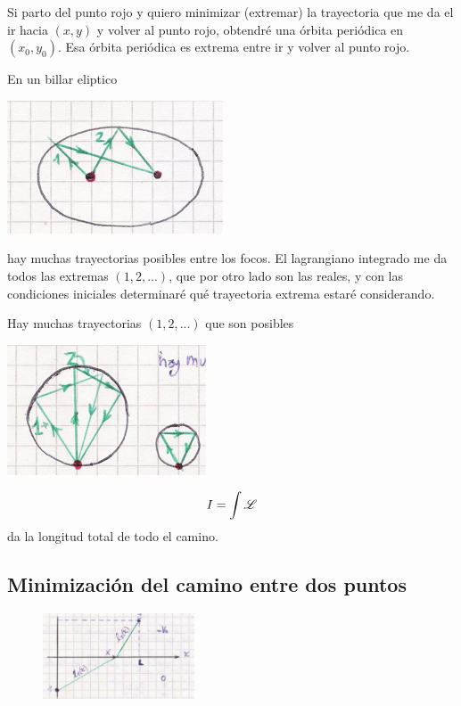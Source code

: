 \documentclass[10pt,oneside]{CBFT_book}
\begin{document}
Si parto del punto rojo y quiero minimizar (extremar) la trayectoria que me da el ir hacia $(x,y)$ y volver al punto rojo, obtendré
una órbita periódica en $(x_0,y_0)$. Esa órbita periódica es extrema entre ir y volver al punto rojo.

En un billar eliptico

\includegraphics[scale=0.3]{images/fig_mc_billar_3.jpg} 

hay muchas trayectorias posibles entre los focos.
El lagrangiano integrado me da todos las extremas $(1,2,...)$, que por otro lado son las reales, y con las condiciones iniciales determinaré qué 
trayectoria extrema estaré considerando.

Hay muchas trayectorias $(1,2,...)$ que son posibles 

\includegraphics[scale=0.3]{images/fig_mc_billar_4.jpg} 

\[
	I = \int \mathscr{L}
\]
da la longitud total de todo el camino.


\subsection{Minimización del camino entre dos puntos}


\begin{figure}[htb]
	\begin{center}
	\includegraphics[width=0.4\textwidth]{images/fig_mc_snell1.pdf}	 
	\end{center}
	\caption{}
	\label{fig_mc_snell1}
\end{figure}
\end{document}

